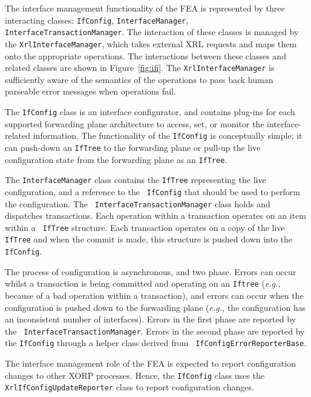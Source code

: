 \documentclass[11pt]{article}
\newcommand{\eg}{\emph{e.g.,}\xspace}
\begin{document}
The interface management functionality of the FEA is represented by
three interacting classes: {\tt IfConfig}, {\tt InterfaceManager},
{\tt InterfaceTransactionManager}.  The interaction of these classes
is managed by the {\tt XrlInterfaceManager}, which takes external XRL
requests and maps them onto the appropriate operations.  The
interactions between these classes and related classes are shown in
Figure~\ref{fig:ifi}. The {\tt XrlInterfaceManager} is sufficiently
aware of the semantics of the operations to pass back human parseable
error messages when operations fail.

The {\tt IfConfig} class is an interface configurator, and contains
plug-ins for each supported forwarding plane architecture to
access, set, or monitor the interface-related information.
The functionality of the {\tt IfConfig} is conceptually simple: it can
push-down an {\tt IfTree} to the forwarding plane or pull-up the live
configuration state from the forwarding plane as an {\tt IfTree}.

The {\tt InterfaceManager} class contains the {\tt IfTree}
representing the live configuration, and a reference to the {\tt
IfConfig} that should be used to perform the configuration.  The {\tt
InterfaceTransactionManager} class holds and dispatches transactions.
Each operation within a transaction operates on an item within a {\tt
IfTree} structure.  Each transaction operates on a copy of the live
{\tt IfTree} and when the commit is made, this structure is pushed
down into the {\tt IfConfig}.

The process of configuration is asynchronous, and two phase.  Errors
can occur whilst a transaction is being committed and operating on an
{\tt Iftree} (\eg because of a bad operation within a transaction), and
errors can occur when the configuration is pushed down to the
forwarding plane (\eg the configuration has an inconsistent number of
interfaces).  Errors in the first phase are reported by the {\tt
InterfaceTransactionManager}.  Errors in the second phase are reported
by the {\tt IfConfig} through a helper class derived from {\tt
IfConfigErrorReporterBase}.

The interface management role of the FEA is expected to report
configuration changes to other XORP processes.  Hence,
the {\tt IfConfig} class uses the {\tt XrlIfConfigUpdateReporter}
class to report configuration changes.
\end{document}
